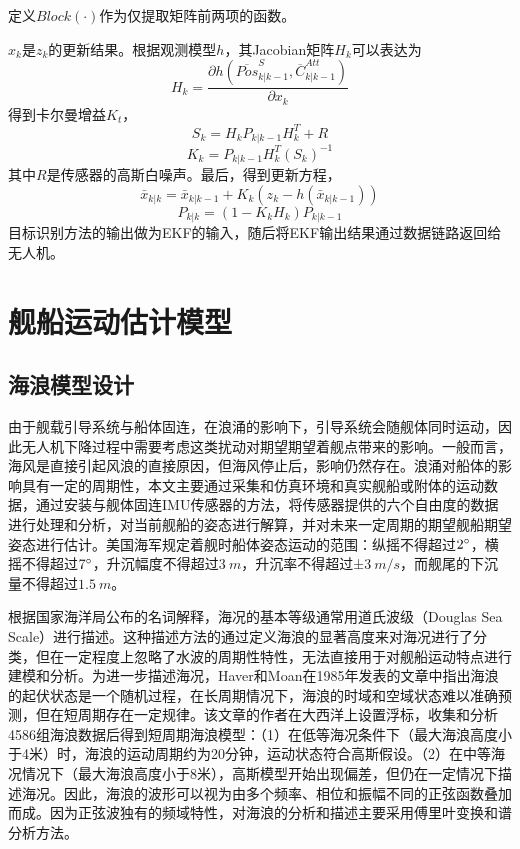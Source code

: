 定义$Block(\cdot)$作为仅提取矩阵前两项的函数。

$x_k$是$z_k$的更新结果。根据观测模型$h$，其Jacobian矩阵$H_k$可以表达为
\begin{equation}
H_k=\frac{\partial h ( \overline{Pos}^S_{k|k-1}, \overline{C}^{Att}_{k|k-1} )}{\partial x_k} 
\end{equation}
得到卡尔曼增益$K_t$，
\begin{equation}
S_k=H_k P_{k|k-1} H^T_k + R
\end{equation}
\begin{equation}
K_k=P_{k|k-1}H^T_k(S_k)^{-1}
\end{equation}
其中$R$是传感器的高斯白噪声。最后，得到更新方程，
\begin{equation}
\bar{x}_{k|k} = \bar{x}_{k|k-1}+K_k(z_k-h(\bar{x}_{k|k-1}))
\end{equation}
\begin{equation}
P_{k|k}=(1-K_k H_k)P_{k|k-1}
\end{equation}
目标识别方法的输出做为EKF的输入，随后将EKF输出结果通过数据链路返回给无人机。

\section{舰船运动估计模型}
\subsection{海浪模型设计}
由于舰载引导系统与船体固连，在浪涌的影响下，引导系统会随舰体同时运动，因此无人机下降过程中需要考虑这类扰动对期望期望着舰点带来的影响。一般而言，海风是直接引起风浪的直接原因，但海风停止后，影响仍然存在。浪涌对船体的影响具有一定的周期性，本文主要通过采集和仿真环境和真实舰船或附体的运动数据，通过安装与舰体固连IMU传感器的方法，将传感器提供的六个自由度的数据进行处理和分析，对当前舰船的姿态进行解算，并对未来一定周期的期望舰船期望姿态进行估计。美国海军规定着舰时船体姿态运动的范围：纵摇不得超过$2\degree$，横摇不得超过$7\degree$，升沉幅度不得超过$3\ m$，升沉率不得超过±$3\ m/s$，而舰尾的下沉量不得超过$1.5\ m$。

根据国家海洋局公布的名词解释，海况的基本等级通常用道氏波级（Douglas Sea Scale）进行描述\cite{sea_state}。这种描述方法的通过定义海浪的显著高度来对海况进行了分类，但在一定程度上忽略了水波的周期性特性，无法直接用于对舰船运动特点进行建模和分析。为进一步描述海况，Haver和Moan在1985年发表的文章\cite{haver1983some}中指出海浪的起伏状态是一个随机过程，在长周期情况下，海浪的时域和空域状态难以准确预测，但在短周期存在一定规律。该文章的作者在大西洋上设置浮标，收集和分析4586组海浪数据后得到短周期海浪模型：（1）在低等海况条件下（最大海浪高度小于4米）时，海浪的运动周期约为20分钟，运动状态符合高斯假设。（2）在中等海况情况下（最大海浪高度小于8米），高斯模型开始出现偏差，但仍在一定情况下描述海况。因此，海浪的波形可以视为由多个频率、相位和振幅不同的正弦函数叠加而成。因为正弦波独有的频域特性，对海浪的分析和描述主要采用傅里叶变换和谱分析方法。

